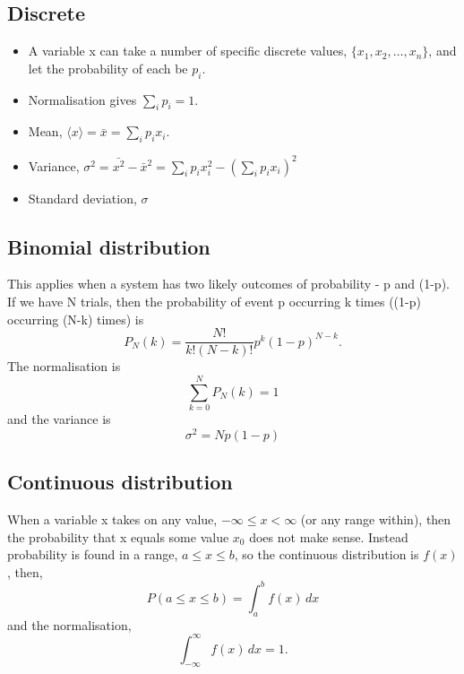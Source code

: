 \documentclass[a4paper, 11pt, normalem]{report}
\begin{document}
\subsection{Discrete}
\begin{itemize}
    \item A variable x can take a number of specific discrete values, $\{x_1, x_2, \dots, x_n\}$, and let the probability of each be $p_i$.
    \item Normalisation gives $\sum_i p_i = 1$.
    \item Mean, $\langle x\rangle = \bar{x} = \sum_i p_ix_i$.
    \item Variance, $\sigma^2 = \bar{x^2} - \bar{x}^2 = \sum_i p_ix_i^2 - \left(\sum_i p_ix_i\right)^2$
    \item Standard deviation, $\sigma$
\end{itemize}

\subsection{Binomial distribution}
This applies when a system has two likely outcomes of probability - p and (1-p).
If we have N trials, then the probability of event p occurring k times ((1-p) occurring (N-k) times) is
\begin{equation}
    P_N(k) = \frac{N!}{k!(N-k)!}p^k(1-p)^{N-k}.
\end{equation}
The normalisation is
\begin{equation}
    \sum_{k=0}^{N} P_N(k) = 1
\end{equation}
and the variance is
\begin{equation}
    \sigma^2 = Np(1-p)
\end{equation}

\subsection{Continuous distribution}
When a variable x takes on any value, $-\infty\leq x <\infty$ (or any range within), then the probability that x equals some value $x_0$ does not make sense.
Instead probability is found in a range, $a\leq x\leq b$, so the continuous distribution is $f(x)$, then,
\begin{equation}
    P(a\leq x\leq b) = \int_{a}^{b} f(x)\,dx
\end{equation}
and the normalisation,
\begin{equation}
    \int_{-\infty}^{\infty} f(x)\,dx = 1.
\end{equation}
\end{document}
